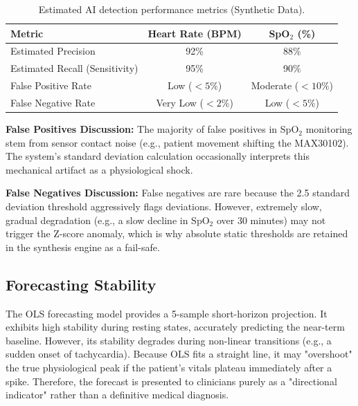 \begin{table}[H]
	\centering
	\caption{Estimated AI detection performance metrics (Synthetic Data).}
	\label{tab:ai_metrics}
	\begin{tabularx}{\linewidth}{Xcc}
		\toprule
		\textbf{Metric} & \textbf{Heart Rate (BPM)} & \textbf{SpO$_2$ (\%)} \\
		\midrule
		Estimated Precision & 92\% & 88\% \\
		Estimated Recall (Sensitivity) & 95\% & 90\% \\
		False Positive Rate & Low ($<5\%$) & Moderate ($<10\%$) \\
		False Negative Rate & Very Low ($<2\%$) & Low ($<5\%$) \\
		\bottomrule
	\end{tabularx}
\end{table}

\textbf{False Positives Discussion:} The majority of false positives in SpO$_2$ monitoring stem from sensor contact noise (e.g., patient movement shifting the MAX30102). The system's standard deviation calculation occasionally interprets this mechanical artifact as a physiological shock.

\textbf{False Negatives Discussion:} False negatives are rare because the 2.5 standard deviation threshold aggressively flags deviations. However, extremely slow, gradual degradation (e.g., a slow decline in SpO$_2$ over 30 minutes) may not trigger the Z-score anomaly, which is why absolute static thresholds are retained in the synthesis engine as a fail-safe.

\subsection{Forecasting Stability}
The OLS forecasting model provides a 5-sample short-horizon projection. It exhibits high stability during resting states, accurately predicting the near-term baseline. However, its stability degrades during non-linear transitions (e.g., a sudden onset of tachycardia). Because OLS fits a straight line, it may "overshoot" the true physiological peak if the patient's vitals plateau immediately after a spike. Therefore, the forecast is presented to clinicians purely as a "directional indicator" rather than a definitive medical diagnosis.
